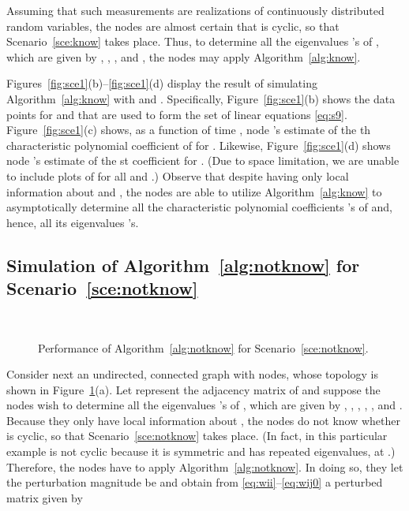 \documentclass[11pt]{article}
\theoremstyle{plain}
\theoremstyle{definition}
\theoremstyle{remark}
\begin{document}
Assuming that such measurements are realizations of continuously distributed random variables, the nodes are almost certain that  is cyclic, so that Scenario~\ref{sce:know} takes place. Thus, to determine all the eigenvalues 's of , which are given by , , , and , the nodes may apply Algorithm~\ref{alg:know}.

Figures~\ref{fig:sce1}(b)--\ref{fig:sce1}(d) display the result of simulating Algorithm~\ref{alg:know} with   and  . Specifically, Figure~\ref{fig:sce1}(b) shows the data points  for  and  that are used to form the set of linear equations \eqref{eq:s9}. Figure~\ref{fig:sce1}(c) shows, as a function of time , node 's estimate  of the th characteristic polynomial coefficient  of  for . Likewise, Figure~\ref{fig:sce1}(d) shows node 's estimate  of the st coefficient  for . (Due to space limitation, we are unable to include plots of  for all  and .) Observe that despite having only local information about  and , the nodes are able to utilize Algorithm~\ref{alg:know} to asymptotically determine all the characteristic polynomial coefficients 's of  and, hence, all its eigenvalues 's.

\subsection{Simulation of Algorithm~\ref{alg:notknow} for Scenario~\ref{sce:notknow}}\label{ssec:simualgoscennotknow}

\begin{figure}[tb]
\centering{}\quad{}\\ \quad{}
\caption{Performance of Algorithm~\ref{alg:notknow} for Scenario~\ref{sce:notknow}.}
\label{fig:sce2}
\end{figure}

Consider next an undirected, connected graph  with  nodes, whose topology is shown in Figure~\ref{fig:sce2}(a). Let  represent the adjacency matrix of  and suppose the nodes wish to determine all the eigenvalues 's of , which are given by , , , , , and . Because they only have local information about , the nodes do not know whether  is cyclic, so that Scenario~\ref{sce:notknow} takes place. (In fact,  in this particular example is not cyclic because it is symmetric and has repeated eigenvalues, at .) Therefore, the nodes have to apply Algorithm~\ref{alg:notknow}. In doing so, they let the perturbation magnitude be  and obtain from \eqref{eq:wii}--\eqref{eq:wij0} a perturbed matrix  given by
\end{document}
